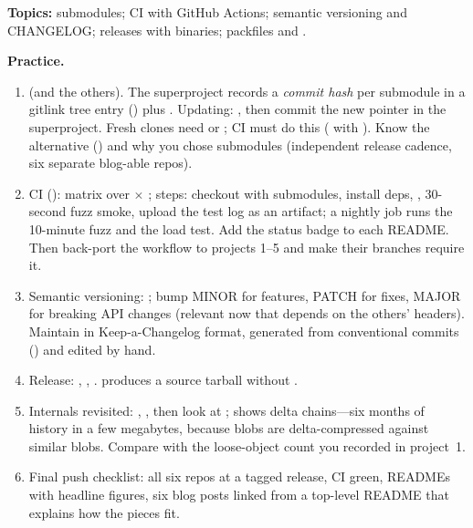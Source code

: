 \begin{gitbox}
\textbf{Topics:} submodules; CI with GitHub Actions; semantic versioning and CHANGELOG; releases with binaries; packfiles and .

\textbf{Practice.}
\begin{enumerate}
  \item {} (and the others). The superproject records a \emph{commit hash} per submodule in a gitlink tree entry () plus . Updating: , then commit the new pointer in the superproject. Fresh clones need  or ; CI must do this ( with ). Know the alternative () and why you chose submodules (independent release cadence, six separate blog-able repos).
  \item CI (): matrix over  $\times$ ; steps: checkout with submodules, install deps, , 30-second fuzz smoke, upload the test log as an artifact; a nightly job runs the 10-minute fuzz and the load test. Add the status badge to each README. Then back-port the workflow to projects 1--5 and make their  branches require it.
  \item Semantic versioning: ; bump MINOR for features, PATCH for fixes, MAJOR for breaking API changes (relevant now that  depends on the others' headers). Maintain  in Keep-a-Changelog format, generated from conventional commits () and edited by hand.
  \item Release: , , .  produces a source tarball without .
  \item Internals revisited: , , then look at ;  shows delta chains---six months of history in a few megabytes, because blobs are delta-compressed against similar blobs. Compare with the loose-object count you recorded in project~1.
  \item Final push checklist: all six repos at a tagged release, CI green, READMEs with headline figures, six blog posts linked from a top-level  README that explains how the pieces fit.
\end{enumerate}
\end{gitbox}
